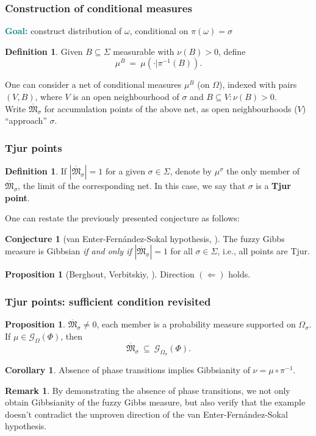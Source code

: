 \documentclass{beamer}
\newcommand{\G}{\mathcal{G}}
\newcommand{\MM}{\overline{\mathfrak{M}}}
\newcommand{\pika}{\boldsymbol{\cdot}}
\newcommand{\1}{\mathbbm{1}}
\newcommand{\5}{\vspace{0.5cm}}
\newcommand{\3}{\vspace{0.3cm}}
\theoremstyle{definition}
\newtheorem{prop}[thm]{Proposition}
\newtheorem{df}[thm]{Definition}
\newtheorem{rem}[thm]{Remark}
\newtheorem{cor}{Corollary}
\newtheorem*{conj}{Conjecture}
\begin{document}

\begin{frame}
\frametitle{Construction of conditional measures}
\textcolor{teal}{\textbf{Goal:}} construct distribution of $\omega$, conditional on $\pi(\omega)=\sigma$
\begin{df}
Given $B\subseteq\Sigma$ measurable with $\nu(B)>0$, define
$$\mu^B ~=~ \mu(\pika|\pi^{-1}(B)).$$
\end{df}
One can consider a net of conditional measures $\mu^B$ (on $\Omega$), indexed with pairs $(V,B)$, where $V$ is an open neighbourhood of $\sigma$ and $B\subseteq V:\nu(B)>0$. \\\vspace{0.5cm}
Write $\MM_\sigma$ for accumulation points of the above net, as open neighbourhoods ($V$) ``approach'' $\sigma$.
\end{frame}

\begin{frame}
\frametitle{Tjur points}
\begin{df}
If $|\MM_\sigma|=1$ for a given $\sigma\in\Sigma$, denote by $\mu^\sigma$ the only member of $\MM_\sigma$, the limit of the corresponding net. In this case, we say that $\sigma$ is a \textbf{Tjur point}.
\end{df}\vspace{0.3cm}
One can restate the previously presented conjecture as follows:
\begin{conj}[van Enter-Fern\'andez-Sokal hypothesis, \cite{Ber}]
The fuzzy Gibbs measure is Gibbsian \textit{if and only if} $|\MM_\sigma|=1$ for all $\sigma\in\Sigma$, i.e., all points are Tjur.
\end{conj}\vspace{0.3cm}
\begin{prop}[Berghout, Verbitskiy, \cite{Ber}]
Direction $(\Leftarrow)$ holds.
\end{prop}
\end{frame}

\begin{frame}
\frametitle{Tjur points: sufficient condition revisited}
\begin{prop}
$\MM_\sigma\neq 0$, each member is a probability measure supported on $\Omega_\sigma$. If $\mu\in\G_\Omega(\Phi)$, then 
$$\MM_\sigma ~\subseteq~ \G_{\Omega_\sigma}(\Phi).$$
\end{prop}\vspace{0.2cm}
\begin{cor}
Absence of phase transitions implies Gibbsianity of $\nu=\mu\circ\pi^{-1}$.
\end{cor}\vspace*{0.2cm}
\begin{rem}
By demonstrating the absence of phase transitions, we not only obtain Gibbsianity of the fuzzy Gibbs measure, but also verify that the example doesn't contradict the unproven direction of the van Enter-Fern\'andez-Sokal hypothesis.
\end{rem}
\end{frame}
\end{document}
